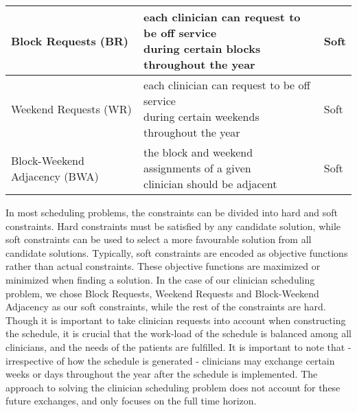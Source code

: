 \begin{table}[h]
\begin{tabular}{ l l l }
		Block Requests (BR)         & \makecell[l]{each clinician can request to be
			off service \\ during certain blocks throughout the year}                       
		& Soft          \\ \hline
		Weekend Requests (WR)        & \makecell[l]{each clinician can request to be
			off service \\ during certain weekends throughout the year}                     
		& Soft          \\ \hline
		Block-Weekend Adjacency (BWA)  & \makecell[l]{the block and weekend
			assignments of a given \\ clinician should be adjacent}                         
		& Soft
    \\\bottomrule %
	\end{tabular}
\end{table}

In most scheduling problems, the constraints can be divided into hard and soft
constraints. Hard constraints must be satisfied by any candidate solution, while
soft constraints can be used to select a more favourable solution from all
candidate solutions. Typically, soft constraints are encoded as objective
functions rather than actual constraints. These objective functions are
maximized or minimized when finding a solution. In the case of our clinician
scheduling problem, we chose Block Requests, Weekend Requests and Block-Weekend
Adjacency as our soft constraints, while the rest of the constraints are hard.
Though it is important to take clinician requests into account when constructing
the schedule, it is crucial that the work-load of the schedule is balanced among
all clinicians, and the needs of the patients are fulfilled. It is important to
note that - irrespective of how the schedule is generated - clinicians may
exchange certain weeks or days throughout the year after the schedule is
implemented. The approach to solving the clinician scheduling problem does not
account for these future exchanges, and only focuses on the full time horizon.
